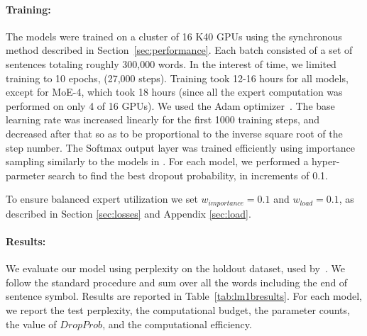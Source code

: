 \documentclass{article}
\begin{document}
\paragraph{Training:} The models were trained on a cluster of 16 K40 GPUs using the synchronous method described in Section~\ref{sec:performance}.  Each batch consisted of a set of sentences totaling roughly 300,000 words.  In the interest of time, we limited training to 10 epochs, (27,000 steps).  Training took 12-16 hours for all models, except for MoE-4, which took 18 hours (since all the expert computation was performed on only 4 of 16 GPUs).  We used the Adam optimizer~\citep{kingma2014adam}. The base learning rate was increased linearly for the first 1000 training steps, and decreased after that so as to be proportional to the inverse square root of the step number.  The Softmax output layer was trained efficiently using importance sampling similarly to the models in \citep{RafalNoam16}.  For each model, we performed a hyper-parmeter search to find the best dropout probability, in increments of 0.1.

To ensure balanced expert utilization we set $w_{importance}=0.1$ and $w_{load}=0.1$, as described in Section \ref{sec:losses} and Appendix \ref{sec:load}.

\paragraph{Results:} We evaluate our model using perplexity on the holdout dataset, used by~\citep{chelba2013one,RafalNoam16}. We follow the standard procedure and sum over all the words including the end of sentence symbol.  Results are reported in Table~\ref{tab:lm1bresults}.   For each model, we report the test perplexity, the computational budget, the parameter counts, the value of $DropProb$, and the computational efficiency.
\end{document}
